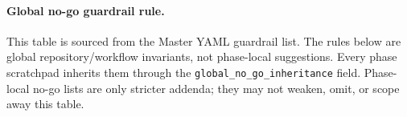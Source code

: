 \paragraph{Global no-go guardrail rule.} This table is sourced from the Master YAML guardrail list. The rules below are global repository/workflow invariants, not phase-local suggestions. Every phase scratchpad inherits them through the \texttt{global\_no\_go\_inheritance} field. Phase-local no-go lists are only stricter addenda; they may not weaken, omit, or scope away this table.

